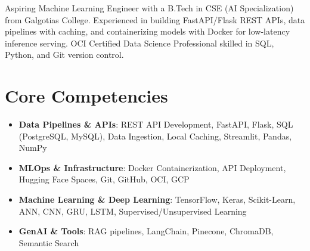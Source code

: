 \documentclass[11pt,a4paper,sans]{moderncv}
\begin{document}
\makecvtitle

\vspace{6pt}
\small{Aspiring Machine Learning Engineer with a B.Tech in CSE (AI Specialization) from Galgotias College. Experienced in building FastAPI/Flask REST APIs, data pipelines with caching, and containerizing models with Docker for low-latency inference serving. OCI Certified Data Science Professional skilled in SQL, Python, and Git version control.}

\section{Core Competencies}
\vspace{1pt}
\begin{itemize}
\item \textbf{Data Pipelines \& APIs}: REST API Development, FastAPI, Flask, SQL (PostgreSQL, MySQL), Data Ingestion, Local Caching, Streamlit, Pandas, NumPy
\item \textbf{MLOps \& Infrastructure}: Docker Containerization, API Deployment, Hugging Face Spaces, Git, GitHub, OCI, GCP
\item \textbf{Machine Learning \& Deep Learning}: TensorFlow, Keras, Scikit-Learn, ANN, CNN, GRU, LSTM, Supervised/Unsupervised Learning
\item \textbf{GenAI \& Tools}: RAG pipelines, LangChain, Pinecone, ChromaDB, Semantic Search
\end{itemize}
\end{document}
